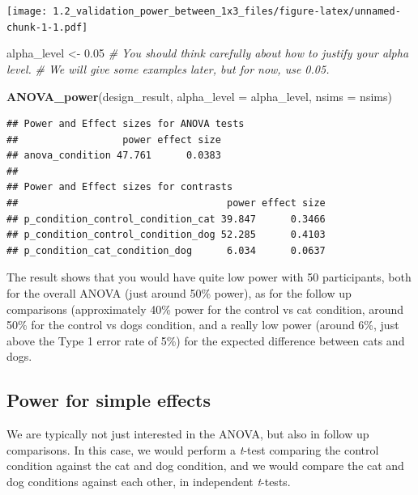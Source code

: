 \documentclass[]{article}
\newenvironment{Shaded}{\begin{snugshade}}{\end{snugshade}}
\newcommand{\KeywordTok}[1]{\textcolor[rgb]{0.13,0.29,0.53}{\textbf{#1}}}
\newcommand{\DataTypeTok}[1]{\textcolor[rgb]{0.13,0.29,0.53}{#1}}
\newcommand{\FloatTok}[1]{\textcolor[rgb]{0.00,0.00,0.81}{#1}}
\newcommand{\StringTok}[1]{\textcolor[rgb]{0.31,0.60,0.02}{#1}}
\newcommand{\CommentTok}[1]{\textcolor[rgb]{0.56,0.35,0.01}{\textit{#1}}}
\newcommand{\NormalTok}[1]{#1}
\begin{document}
\texttt{[image: 1.2\_validation\_power\_between\_1x3\_files/figure-latex/unnamed-chunk-1-1.pdf]}

\begin{Shaded}
\begin{Highlighting}[]
\NormalTok{alpha_level <-}\StringTok{ }\FloatTok{0.05}
\CommentTok{# You should think carefully about how to justify your alpha level.}
\CommentTok{# We will give some examples later, but for now, use 0.05.}

\KeywordTok{ANOVA_power}\NormalTok{(design_result, }\DataTypeTok{alpha_level =}\NormalTok{ alpha_level, }\DataTypeTok{nsims =}\NormalTok{ nsims)}
\end{Highlighting}
\end{Shaded}

\begin{verbatim}
## Power and Effect sizes for ANOVA tests
##                  power effect size
## anova_condition 47.761      0.0383
## 
## Power and Effect sizes for contrasts
##                                    power effect size
## p_condition_control_condition_cat 39.847      0.3466
## p_condition_control_condition_dog 52.285      0.4103
## p_condition_cat_condition_dog      6.034      0.0637
\end{verbatim}

\begin{Shaded}
\end{Shaded}

The result shows that you would have quite low power with 50
participants, both for the overall ANOVA (just around 50\% power), as
for the follow up comparisons (approximately 40\% power for the control
vs cat condition, around 50\% for the control vs dogs condition, and a
really low power (around 6\%, just above the Type 1 error rate of 5\%)
for the expected difference between cats and dogs.

\subsection{Power for simple effects}\label{power-for-simple-effects}

We are typically not just interested in the ANOVA, but also in follow up
comparisons. In this case, we would perform a \emph{t}-test comparing
the control condition against the cat and dog condition, and we would
compare the cat and dog conditions against each other, in independent
\emph{t}-tests.
\end{document}
